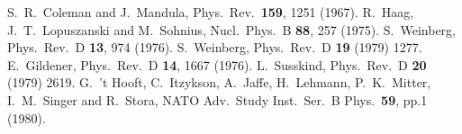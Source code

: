 \documentclass[final,3p,11pt,pdflatex]{elsarticle}
\begin{document}
\begin{thebibliography}{100}
  S.~R.~Coleman and J.~Mandula,
  Phys.\ Rev.\  {\bf 159}, 1251 (1967).
  R.~Haag, J.~T.~Lopuszanski and M.~Sohnius,
  Nucl.\ Phys.\ B {\bf 88}, 257 (1975).
  S.~Weinberg,
  Phys.\ Rev.\ D {\bf 13}, 974 (1976).
  S.~Weinberg,
  Phys.\ Rev.\ D {\bf 19} (1979) 1277.
  E.~Gildener,
  Phys.\ Rev.\ D {\bf 14}, 1667 (1976).
  L.~Susskind,
  Phys.\ Rev.\ D {\bf 20} (1979) 2619.
  G.~'t Hooft, C.~Itzykson, A.~Jaffe, H.~Lehmann, P.~K.~Mitter, I.~M.~Singer and R.~Stora,
  NATO Adv.\ Study Inst.\ Ser.\ B Phys.\  {\bf 59}, pp.1 (1980).


\end{thebibliography}
\end{document}
